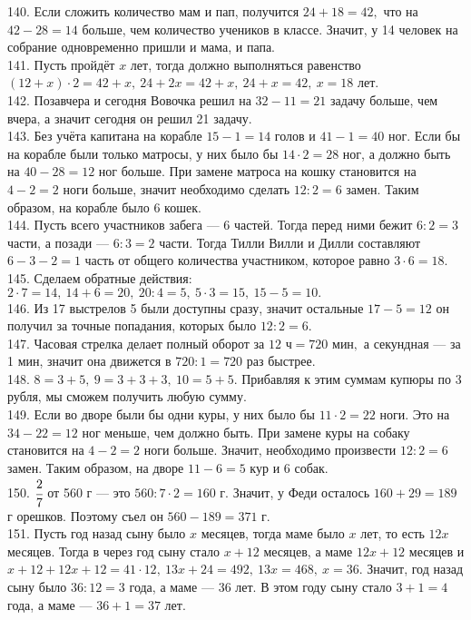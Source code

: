 140. Если сложить количество мам и пап, получится $24+18=42,$ что на $42-28=14$ больше, чем количество учеников в классе. Значит, у 14 человек на собрание одновременно пришли и мама, и папа.\\
141. Пусть пройдёт $x$ лет, тогда должно выполняться равенство $(12+x)\cdot2=42+x,\ 24+2x=42+x,\ 24+x=42,\ x=18$ лет.\\
142. Позавчера и сегодня Вовочка решил на $32-11=21$ задачу больше, чем вчера, а значит сегодня он решил 21 задачу.\\
143. Без учёта капитана на корабле $15-1=14$ голов и $41-1=40$ ног. Если бы на корабле были только матросы, у них было бы $14\cdot2=28$ ног, а должно быть на $40-28=12$ ног больше. При замене матроса на кошку становится на $4-2=2$ ноги больше, значит необходимо сделать $12:2=6$ замен. Таким образом, на корабле было 6 кошек.\\
144. Пусть всего участников забега --- 6 частей. Тогда перед ними бежит $6:2=3$ части, а позади --- $6:3=2$ части. Тогда Тилли Вилли и Дилли составляют $6-3-2=1$ часть от общего количества участником, которое равно $3\cdot6=18.$\\
145. Сделаем обратные действия: $2\cdot7=14,\ 14+6=20,\ 20:4=5,\ 5\cdot3=15,\ 15-5=10.$\\
146. Из 17 выстрелов 5 были доступны сразу, значит остальные $17-5=12$ он получил за точные попадания, которых было $12:2=6.$\\
147. Часовая стрелка делает полный оборот за $12\text{ ч}=720\text{ мин},$ а секундная --- за 1 мин, значит она движется в $720:1=720$ раз быстрее.\\
148. $8=3+5,\ 9=3+3+3,\ 10=5+5.$ Прибавляя к этим суммам купюры по 3 рубля, мы сможем получить любую сумму.\\
149. Если во дворе были бы одни куры, у них было бы $11\cdot2=22$ ноги. Это на $34-22=12$ ног меньше, чем должно быть. При замене куры на собаку становится на $4-2=2$ ноги больше. Значит, необходимо произвести $12:2=6$ замен. Таким образом, на дворе $11-6=5$ кур и 6 собак.\\
150. $\cfrac{2}{7}$ от 560 г --- это $560:7\cdot2=160$ г. Значит, у Феди осталось $160+29=189$ г орешков. Поэтому съел он $560-189=371$ г.\\
151. Пусть год назад сыну было $x$ месяцев, тогда маме было $x$ лет, то есть $12x$ месяцев. Тогда в через год сыну стало $x+12$ месяцев, а маме $12x+12$ месяцев
и $x+12+12x+12=41\cdot12,\ 13x+24=492,\ 13x=468,\ x=36.$ Значит, год назад сыну было $36:12=3$ года, а маме --- 36 лет. В этом году сыну стало $3+1=4$ года, а маме --- $36+1=37$ лет.\\
